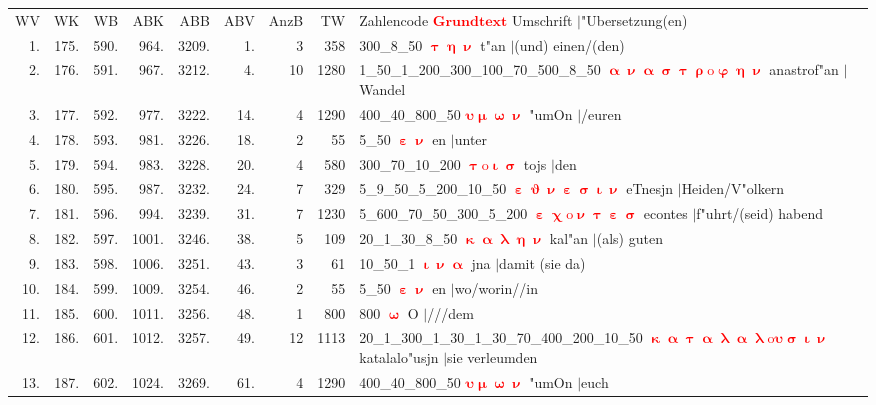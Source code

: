\documentclass[a4paper,10pt,landscape]{article}
\begin{document}
\begin{tabular}{rrrrrrrrp{120mm}}
WV&WK&WB&ABK&ABB&ABV&AnzB&TW&Zahlencode \textcolor{red}{$\boldsymbol{Grundtext}$} Umschrift $|$"Ubersetzung(en)\\
1.&175.&590.&964.&3209.&1.&3&358&300\_8\_50 \textcolor{red}{$\boldsymbol{\uptau\upeta\upnu}$} t"an $|$(und) einen/(den)\\
2.&176.&591.&967.&3212.&4.&10&1280&1\_50\_1\_200\_300\_100\_70\_500\_8\_50 \textcolor{red}{$\boldsymbol{\upalpha\upnu\upalpha\upsigma\uptau\uprho\mathrm{o}\upvarphi\upeta\upnu}$} anastrof"an $|$Wandel\\
3.&177.&592.&977.&3222.&14.&4&1290&400\_40\_800\_50 \textcolor{red}{$\boldsymbol{\upsilon\upmu\upomega\upnu}$} "umOn $|$/euren\\
4.&178.&593.&981.&3226.&18.&2&55&5\_50 \textcolor{red}{$\boldsymbol{\upepsilon\upnu}$} en $|$unter\\
5.&179.&594.&983.&3228.&20.&4&580&300\_70\_10\_200 \textcolor{red}{$\boldsymbol{\uptau\mathrm{o}\upiota\upsigma}$} tojs $|$den\\
6.&180.&595.&987.&3232.&24.&7&329&5\_9\_50\_5\_200\_10\_50 \textcolor{red}{$\boldsymbol{\upepsilon\upvartheta\upnu\upepsilon\upsigma\upiota\upnu}$} eTnesjn $|$Heiden/V"olkern\\
7.&181.&596.&994.&3239.&31.&7&1230&5\_600\_70\_50\_300\_5\_200 \textcolor{red}{$\boldsymbol{\upepsilon\upchi\mathrm{o}\upnu\uptau\upepsilon\upsigma}$} econtes $|$f"uhrt/(seid) habend\\
8.&182.&597.&1001.&3246.&38.&5&109&20\_1\_30\_8\_50 \textcolor{red}{$\boldsymbol{\upkappa\upalpha\uplambda\upeta\upnu}$} kal"an $|$(als) guten\\
9.&183.&598.&1006.&3251.&43.&3&61&10\_50\_1 \textcolor{red}{$\boldsymbol{\upiota\upnu\upalpha}$} jna $|$damit (sie da)\\
10.&184.&599.&1009.&3254.&46.&2&55&5\_50 \textcolor{red}{$\boldsymbol{\upepsilon\upnu}$} en $|$wo/worin//in\\
11.&185.&600.&1011.&3256.&48.&1&800&800 \textcolor{red}{$\boldsymbol{\upomega}$} O $|$///dem\\
12.&186.&601.&1012.&3257.&49.&12&1113&20\_1\_300\_1\_30\_1\_30\_70\_400\_200\_10\_50 \textcolor{red}{$\boldsymbol{\upkappa\upalpha\uptau\upalpha\uplambda\upalpha\uplambda\mathrm{o}\upsilon\upsigma\upiota\upnu}$} katalalo"usjn $|$sie verleumden\\
13.&187.&602.&1024.&3269.&61.&4&1290&400\_40\_800\_50 \textcolor{red}{$\boldsymbol{\upsilon\upmu\upomega\upnu}$} "umOn $|$euch\\

\end{tabular}
\end{document}

